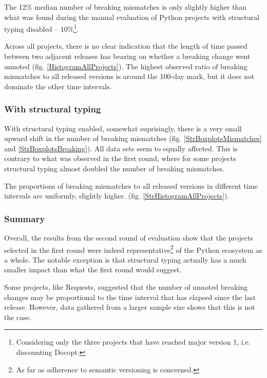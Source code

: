 \documentclass{l4proj}
\begin{document}
The 12\% median number of breaking mismatches is only slightly higher
than what was found during the manual evaluation of Python projects
with structural typing disabled -- 10\%\footnote{Considering only the
three projects that have reached major version 1, i.e.
discounting Docopt.}.

Across all projects, there is no clear indication that the length of
time passed between two adjacent releases has bearing on whether a
breaking change went unnoted (fig. \ref{HistogramAllProjects}). The
highest observed ratio of breaking mismatches to all released versions
is around the 100-day mark, but it does not dominate the other time
intervals.

\subsubsection{With structural typing}

With structural typing enabled, somewhat suprisingly, there is a very
small upward shift in the number of breaking mismatches (fig.
\ref{StrBoxplotsMismatches} and \ref{StrBoxplotsBreaking}). All data
sets seem to equally affected. This is contrary to what was observed
in the first round, where for some projects structural typing almost
doubled the number of breaking mismatches.

The proportions of breaking mismatches to all released versions in
different time intervals are uniformly, slightly higher. (fig.
\ref{StrHistogramAllProjects}).

\subsubsection{Summary}

Overall, the results from the second round of evaluation show that the
projects selected in the first round were indeed
representative\footnote{As far as adherence to semantic versioning is
concerned.} of the Python ecosystem as a whole. The notable exception
is that structural typing actually has a much smaller impact than what
the first round would suggest.

Some projects, like Requests, suggested that the number of unnoted
breaking changes may be proportional to the time interval that has
elapsed since the last release. However, data gathered from a larger
sample size shows that this is not the case.


\end{document}
